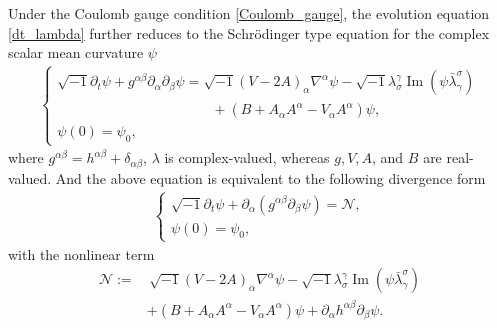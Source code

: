 \documentclass[11pt,letterpaper,reqno]{amsart}
\numberwithin{equation}{section}
\theoremstyle{definition}
\theoremstyle{remark}
\begin{document}
Under the Coulomb gauge condition \eqref{Coulomb_gauge}, the evolution equation \eqref{dt_lambda} further reduces to the Schr\"odinger type equation for the complex scalar mean curvature   $\psi$
\begin{align*}
	\begin{cases}
		\sqrt{-1} \partial_t \psi+g^{\alpha \beta} \partial_\alpha \partial_\beta \psi
		= \sqrt{-1}(V-2 A)_\alpha \nabla^\alpha \psi 	-\sqrt{-1} \lambda_\sigma^\gamma \operatorname{Im}\left(\psi \bar{\lambda}_\gamma^\sigma\right)\\
		\qquad\qquad\qquad\qquad\qquad\quad+\left(B+A_\alpha A^\alpha-V_\alpha A^\alpha\right) \psi,\\
		\psi(0)=\psi_0,
	\end{cases}
\end{align*}
where $ g^{\alpha \beta}= h^{\alpha \beta} +\delta_{\alpha \beta} $,   \(\lambda\) is complex-valued, whereas \(g,V,A\), and \(B\) are
real-valued.
And the above equation is equivalent to the following divergence form
\begin{align}  \label{gaugsmcf}
	\begin{cases}
	\sqrt{-1} \partial_t \psi+\partial_\alpha(g^{\alpha \beta}  \partial_\beta \psi)
= \mathcal{N},\\
	\psi(0)=\psi_0,
\end{cases}
\end{align}
with the nonlinear term
\begin{align*}
	 \mathcal{N}:=&\,\sqrt{-1}(V-2 A)_\alpha \nabla^\alpha \psi 	-\sqrt{-1} \lambda_\sigma^\gamma \operatorname{Im}\left(\psi \bar{\lambda}_\gamma^\sigma\right)\\
	 &+\left(B+A_\alpha A^\alpha-V_\alpha A^\alpha\right) \psi+\partial_{\alpha} h^{\alpha \beta} \partial_\beta \psi.\nonumber
\end{align*}
\end{document}
